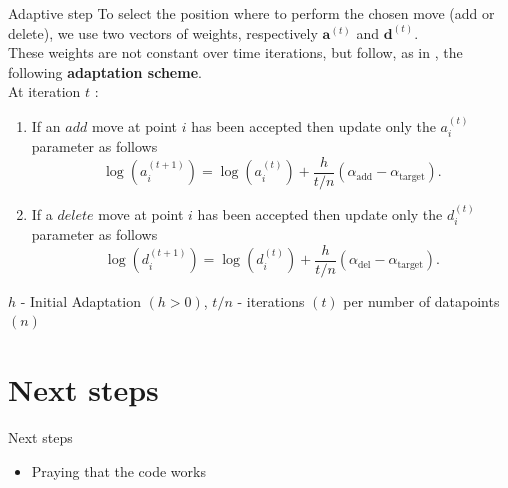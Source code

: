 \begin{frame}{Adaptive step}
    To select the position where to perform the chosen move (add or delete), we use two vectors of weights, respectively $\bm{a}^{(t)}$
    and $\bm{d}^{(t)}$. \\
    These weights are not constant over time iterations, but follow, as in \cite{bensonAdaptiveMCMCMultiple2018}, the following 
    \textbf{adaptation scheme}.\\

    At iteration $t$ :
    \begin{enumerate}
        \item If an $add$ move at point $i$ has been accepted then update only the $a_i^{(t)}$ parameter as follows
		\[
		\log (a_i^{(t+1)})=\log (a_i^{(t)})+\frac{h}{t / n}(\alpha_{\text{add}}-\alpha_{\text{target}}) .
		\]
        \item If a $delete$ move at point $i$ has been accepted then update only the $d_i^{(t)}$ parameter as follows
		\[
		\log (d_i^{(t+1)})=\log (d_i^{(t)})+\frac{h}{t / n}(\alpha_{\text{del}}-\alpha_{\text{target}}) .
		\]
        \end{enumerate}
$h$ - Initial Adaptation $(h>0)$,
$t / n$ - iterations $(t)$ per number of datapoints $(n)$

\end{frame}



\section{Next steps}
\begin{frame}{Next steps}

    \begin{itemize}
        \item Praying that the code works
    \end{itemize}




\end{frame}



